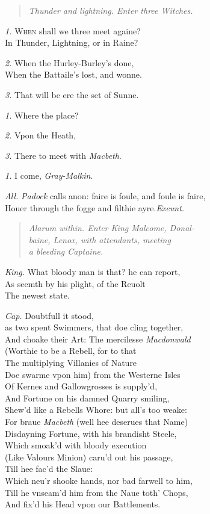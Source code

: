 \documentclass[12pt]{sides}
\newcommand{\StageDir}[1]{\begin{quote}\centering\em #1\end{quote}}
\newcommand{\elStageDir}[1]{\hfill\textit{#1}}
\newcommand{\dia}[1]{\hskip 15pt\textit{#1}\hskip 6pt}
\begin{document}
	\begin{multicols}{2}		
        \StageDir{Thunder and lightning. Enter three Witches.}
        \dia{1.} \lettrine{W}{hen} shall we three meet againe? \\ In Thunder, Lightning, or in Raine?
        
        \dia{2.} When the Hurley-Burley's done, \\ When the Battaile's lost, and wonne.
        
        \dia{3.} That will be ere the set of Sunne.
        
        \dia{1.} Where the place?
        
        \dia{2.} Vpon the Heath,
        
        \dia{3.} There to meet with \textit{Macbeth}.
        
        \dia{1.} I come, \textit{Gray-Malkin}.
        
        \dia{All.} \textit{Padock} calls anon: faire is foule, and foule is faire, \\ Houer through the fogge and filthie ayre.\elStageDir{Exeunt.}
			
            \StageDir{Alarum within. Enter King Malcome, Donal-\\baine, Lenox, with attendants, meeting\\ a bleeding Captaine.}
			\dia{King.} What bloody man is that? he can report, \\  As seemth by his plight, of the Reuolt \\ The newest state.
			
			\dia{Cap.} Doubtfull it stood,\\ as two spent Swimmers, that doe cling together,\\ And choake their Art: The mercilesse \textit{Macdonwald} \\ (Worthie to be a Rebell, for to that \\ The multiplying Villanies of Nature \\ Doe swarme vpon him) from the Westerne Isles \\ Of Kernes and Gallowgrosses is supply'd, \\ And Fortune on his damned Quarry smiling, \\ Shew'd like a Rebells Whore: but all's too weake: \\ For braue \textit{Macbeth} (well hee deserues that Name) \\ Disdayning Fortune, with his brandisht Steele, \\ Which smoak'd with bloody execution \\ (Like Valours Minion) caru'd out his passage, \\ Till hee fac'd the Slaue: \\ Which neu'r shooke hands, nor bad farwell to him, \\ Till he vnseam'd him from the Naue toth' Chops, \\ And fix'd his Head vpon our Battlements.
			

\end{multicols}
\end{document}
